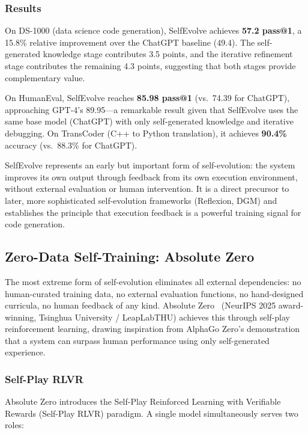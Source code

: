 \subsubsection{Results}

On DS-1000 (data science code generation), SelfEvolve achieves \textbf{57.2 pass@1}, a 15.8\% relative improvement over the ChatGPT baseline (49.4). The self-generated knowledge stage contributes 3.5 points, and the iterative refinement stage contributes the remaining 4.3 points, suggesting that both stages provide complementary value.

On HumanEval, SelfEvolve reaches \textbf{85.98 pass@1} (vs.\ 74.39 for ChatGPT), approaching GPT-4's 89.95---a remarkable result given that SelfEvolve uses the same base model (ChatGPT) with only self-generated knowledge and iterative debugging. On TransCoder (C++ to Python translation), it achieves \textbf{90.4\%} accuracy (vs.\ 88.3\% for ChatGPT).

SelfEvolve represents an early but important form of self-evolution: the system improves its own output through feedback from its own execution environment, without external evaluation or human intervention. It is a direct precursor to later, more sophisticated self-evolution frameworks (Reflexion, DGM) and establishes the principle that execution feedback is a powerful training signal for code generation.

\subsection{Zero-Data Self-Training: Absolute Zero}
\label{sec:absolute-zero}

The most extreme form of self-evolution eliminates all external dependencies: no human-curated training data, no external evaluation functions, no hand-designed curricula, no human feedback of any kind. Absolute Zero~\citep{zhao2025absolutezero} (NeurIPS 2025 award-winning, Tsinghua University / LeapLabTHU) achieves this through self-play reinforcement learning, drawing inspiration from AlphaGo Zero's demonstration that a system can surpass human performance using only self-generated experience.

\subsubsection{Self-Play RLVR}

Absolute Zero introduces the Self-Play Reinforced Learning with Verifiable Rewards (Self-Play RLVR) paradigm. A single model simultaneously serves two roles:

